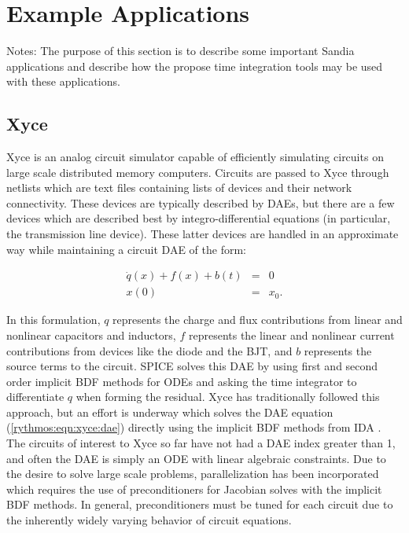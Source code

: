 \documentclass[pdf,ps2pdf,11pt]{SANDreport}
\begin{document}
%
%

\section{Example Applications}

Notes: The purpose of this section is to describe some important Sandia
applications and describe how the propose time integration tools may be used
with these applications.

\subsection{Xyce}

Xyce \cite{Xyce,Xyce_time} is an analog circuit simulator capable of efficiently
simulating circuits on large scale distributed memory computers.  Circuits are
passed to Xyce through netlists which are text files containing lists of
devices and their network connectivity.  These devices are typically described
by DAEs, but there are a few devices which are described best by
integro-differential equations (in particular, the transmission line device).
These latter devices are handled in an approximate way while maintaining a
circuit DAE of the form:

\begin{eqnarray}\label{rythmos:eqn:xyce:dae}
\dot{q}(x)+f(x)+b(t) & = & 0 \\
x(0) & = & x_0.
\end{eqnarray}

In this formulation, $q$ represents the charge and flux contributions from
linear and nonlinear capacitors and inductors, $f$ represents the linear and
nonlinear current contributions from devices like the diode and the BJT, and
$b$ represents the source terms to the circuit.   SPICE \cite{Spice} solves
this DAE by using first and second order implicit BDF methods for ODEs and
asking the time integrator to differentiate $q$ when forming the residual.
Xyce has traditionally followed this approach, but an effort is underway which
solves the DAE equation (\ref{rythmos:eqn:xyce:dae}) directly using the
implicit BDF methods from IDA \cite{IDA}.   The circuits of interest to Xyce so
far have not had a DAE index greater than 1, and often the DAE is simply an ODE
with linear algebraic constraints.  Due to the desire to solve large scale
problems, parallelization has been incorporated which requires the use of
preconditioners for Jacobian solves with the implicit BDF methods.  In general,
preconditioners must be tuned for each circuit due to the inherently widely
varying behavior of circuit equations.
\end{document}
